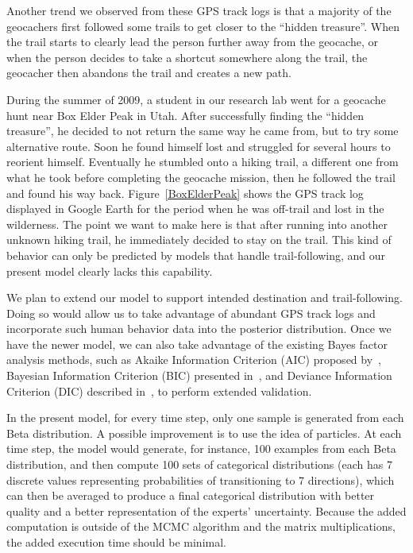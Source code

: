 \documentclass[smallextended,natbib]{svjour3}
\begin{document}
Another trend we observed from these GPS track logs is that a majority of the geocachers first followed some trails to get closer to the ``hidden treasure''. When the trail starts to clearly lead the person further away from the geocache, or when the person decides to take a shortcut somewhere along the trail, the geocacher then abandons the trail and creates a new path.

During the summer of 2009, a student in our research lab went for a geocache hunt near Box Elder Peak in Utah. After successfully finding the ``hidden treasure'', he decided to not return the same way he came from, but to try some alternative route. Soon he found himself lost and struggled for several hours to reorient himself. Eventually he stumbled onto a hiking trail, a different one from what he took before completing the geocache mission, then he followed the trail and found his way back. Figure~\ref{BoxElderPeak} shows the GPS track log displayed in Google Earth for the period when he was off-trail and lost in the wilderness. The point we want to make here is that after running into another unknown hiking trail, he immediately decided to stay on the trail. This kind of behavior can only be predicted by models that handle trail-following, and our present model clearly lacks this capability.

We plan to extend our model to support intended destination and trail-following. Doing so would allow us to take advantage of abundant GPS track logs and incorporate such human behavior data into the posterior distribution. Once we have the newer model, we can also take advantage of the existing Bayes factor analysis methods, such as Akaike Information Criterion (AIC) proposed by~\cite{AIC}, Bayesian Information Criterion (BIC) presented in~\cite{BIC}, and Deviance Information Criterion (DIC) described in~\cite{DIC}, to perform extended validation.

In the present model, for every time step, only one sample is generated from each Beta distribution. A possible improvement is to use the idea of particles. At each time step, the model would generate, for instance, 100 examples from each Beta distribution, and then compute 100 sets of categorical distributions (each has 7 discrete values representing probabilities of transitioning to 7 directions), which can then be averaged to produce a final categorical distribution with better quality and a better representation of the experts' uncertainty. Because the added computation is outside of the MCMC algorithm and the matrix multiplications, the added execution time should be minimal.
\end{document}
